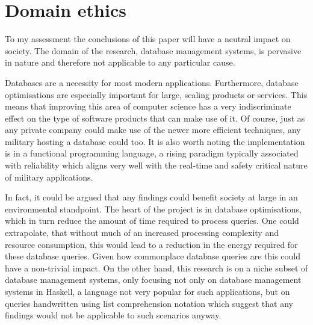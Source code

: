 \section{Domain ethics}
To my assessment the conclusions of this paper will have a neutral impact on
society. The domain of the research, database management systems, is pervasive in nature and therefore not
applicable to any particular cause.

Databases are a necessity for most modern applications. Furthermore, database
optimisations are especially important for large, scaling products or services.
This means that improving this area of computer science has a very
indiscriminate effect on the type of software products that can make use of it.
Of course, just as any private company could make use of the newer more
efficient techniques, any military hosting a database could too. It is also
worth noting the implementation is in a functional programming language, a
rising paradigm \cite{LanguagePopularity} typically associated with reliability
\cite{RealWorldHaskell} which aligns very well with the real-time and safety critical nature of military applications.

In fact, it could be argued that any findings could benefit society at large in an environmental standpoint. The heart of the project is in database optimisations, which in turn reduce the amount of time required to process queries. One could extrapolate, that without much of an increased processing complexity and resource consumption, this would lead to a reduction in the energy required for these database queries. Given how commonplace database queries are this could have a non-trivial impact.
On the other hand, this research is on a niche subset of database
management systems, only focusing not only on database management systems in
Haskell, a language not very popular for such applications, but on queries
handwritten using list comprehension notation which suggest that any
findings would not be applicable to such scenarios anyway.
